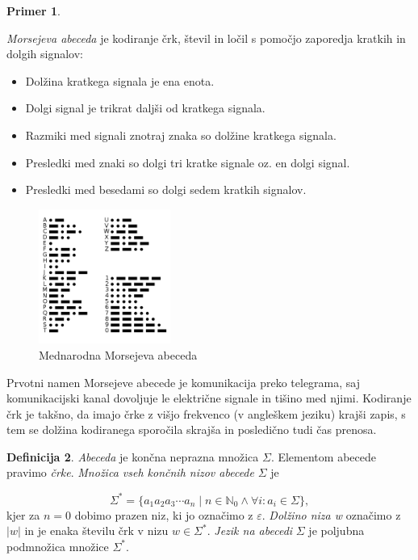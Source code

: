 \documentclass{amsart}
\newcommand{\N}{\mathbb{N}}
\theoremstyle{definition} %
\newtheorem{definicija}{Definicija}[section]
\newtheorem{primer}[definicija]{Primer}
\theoremstyle{plain} %
\begin{document}
\begin{primer}\label{Morse}

    \textit{Morsejeva abeceda} je kodiranje črk, števil in ločil s pomočjo zaporedja kratkih
    in dolgih signalov:

    \begin{itemize}
        \item Dolžina kratkega signala je ena enota.
        \item Dolgi signal je trikrat daljši od kratkega signala.
        \item Razmiki med signali znotraj znaka so dolžine kratkega signala.
        \item Presledki med znaki so dolgi tri kratke signale oz. en dolgi signal.
        \item Presledki med besedami so dolgi sedem kratkih signalov.
    \end{itemize}

    \begin{figure}[h]
        \centering
        \includegraphics[width=4.3cm]{International_Morse_Code.svg.png}
        \caption{Mednarodna Morsejeva abeceda}
        \label{fig:Morse}
    \end{figure}

    Prvotni namen Morsejeve abecede je komunikacija preko telegrama, saj komunikacijski
    kanal dovoljuje le električne signale in tišino med njimi. Kodiranje črk je takšno,
    da imajo črke z višjo frekvenco (v angleškem jeziku) krajši zapis, s tem se dolžina
    kodiranega sporočila skrajša in posledično tudi čas prenosa.

\end{primer}

\begin{definicija}

    \textit{Abeceda} je končna neprazna množica $ \Sigma $. Elementom abecede pravimo \textit{črke}.
    \textit{Množica vseh končnih nizov abecede} $ \Sigma $ je

    \[
        \Sigma^* = \{ a_1 a_2 a_3 \cdots a_n \mid n \in \N_0 \land \forall i: a_i \in \Sigma \}, 
    \]
    kjer za $ n = 0 $ dobimo prazen niz, ki jo označimo z $ \varepsilon $.
    \textit{Dolžino niza w} označimo z $ |w| $ in je enaka številu črk v nizu $ w \in \Sigma^* $.
    \textit{Jezik na abecedi} $ \Sigma $ je poljubna podmnožica množice $ \Sigma^* $. 

\end{definicija}
\end{document}
